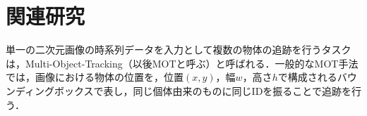\section{関連研究}

単一の二次元画像の時系列データを入力として複数の物体の追跡を行うタスクは，Multi-Object-Tracking（以後MOTと呼ぶ）と呼ばれる．一般的なMOT手法では，画像における物体の位置を，位置$(x,y)$，幅$w$，高さ$h$で構成されるバウンディングボックスで表し，同じ個体由来のものに同じIDを振ることで追跡を行う．